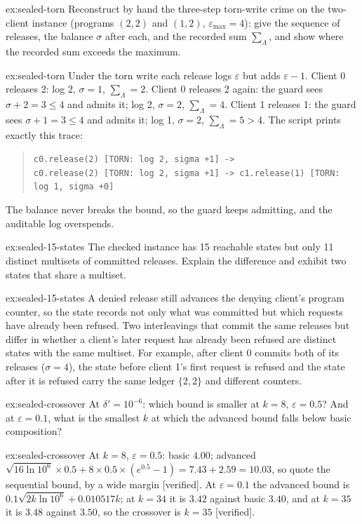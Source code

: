 \documentclass[11pt,a4paper]{article}
\theoremstyle{definition}
\begin{document}
\begin{pdexercise}[kind=Trace,rating=2]{ex:sealed-torn}
Reconstruct by hand the three-step torn-write crime on the two-client instance
(programs $(2,2)$ and $(1,2)$, $\varepsilon_{\max}=4$): give the sequence of
releases, the balance $\sigma$ after each, and the recorded sum
$\sum_\Lambda$, and show where the recorded sum exceeds the maximum.
\end{pdexercise}
\begin{pdsolution}{ex:sealed-torn}
Under the torn write each release logs $\varepsilon$ but adds $\varepsilon-1$.
Client 0 releases 2: log 2, $\sigma=1$, $\sum_\Lambda=2$. Client 0 releases 2
again: the guard sees $\sigma+2=3\le4$ and admits it; log 2, $\sigma=2$,
$\sum_\Lambda=4$. Client 1 releases 1: the guard sees $\sigma+1=3\le4$ and
admits it; log 1, $\sigma=2$, $\sum_\Lambda=5>4$. The script prints exactly
this trace:
\begin{quote}\footnotesize\texttt{c0.release(2) [TORN: log 2, sigma +1] ->}\\
\texttt{c0.release(2) [TORN: log 2, sigma +1] -> c1.release(1) [TORN: log 1, sigma +0]}
\end{quote}
The balance never breaks the bound, so the guard keeps admitting, and the
auditable log overspends.
\end{pdsolution}

\begin{pdexercise}[kind=Trace,rating=2]{ex:sealed-15-states}
The checked instance has 15 reachable states but only 11 distinct multisets of
committed releases. Explain the difference and exhibit two states that share a
multiset.
\end{pdexercise}
\begin{pdsolution}{ex:sealed-15-states}
A denied release still advances the denying client's program counter, so the
state records not only what was committed but which requests have already been
refused. Two interleavings that commit the same releases but differ in whether
a client's later request has already been refused are distinct states with the
same multiset. For example, after client 0 commits both of its releases
($\sigma=4$), the state before client 1's first request is refused and the
state after it is refused carry the same ledger $\{2,2\}$ and different
counters.
\end{pdsolution}

\begin{pdexercise}[kind=Check,rating=1]{ex:sealed-crossover}
At $\delta'=10^{-6}$: which bound is smaller at $k=8$, $\varepsilon=0.5$? And at
$\varepsilon=0.1$, what is the smallest $k$ at which the advanced bound falls
below basic composition?
\end{pdexercise}
\begin{pdsolution}{ex:sealed-crossover}
At $k=8$, $\varepsilon=0.5$: basic $4.00$; advanced
$\sqrt{16\ln 10^{6}}\times0.5+8\times0.5\times(e^{0.5}-1)=7.43+2.59=10.03$,
so quote the sequential bound, by a wide margin [verified]. At
$\varepsilon=0.1$ the advanced bound is
$0.1\sqrt{2k\ln 10^{6}}+0.010517k$; at $k=34$ it is $3.42$ against basic
$3.40$, and at $k=35$ it is $3.48$ against $3.50$, so the crossover is $k=35$
[verified].
\end{pdsolution}
\end{document}
